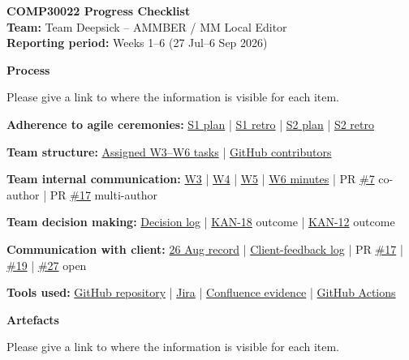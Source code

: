 \documentclass[10pt,a4paper]{article}
\newcommand{\ghbase}{https://github.com/lkevincc0/mm-local-editor}
\newcommand{\PR}[1]{\href{\ghbase/pull/#1}{\##1}}
\newcommand{\jirabase}{https://student-team-zvzgb5e3.atlassian.net}
\newcommand{\JIRA}[1]{\href{\jirabase/browse/KAN-#1}{KAN-#1}}
\newcommand{\wikibase}{https://student-team-zvzgb5e3.atlassian.net/wiki/spaces/~7120206e0163ea5d37428b992775145124d7e8/pages/}
\newcommand{\wpage}[2]{\href{\wikibase#1}{#2}}
\begin{document}
\begin{center}
{\LARGE\bfseries\color{accent} COMP30022 Progress Checklist}\\[3pt]
{\normalsize \textbf{Team:} Team Deepsick -- AMMBER / MM Local Editor}\\[1pt]
{\normalsize \textbf{Reporting period:} Weeks 1--6 (27 Jul--6 Sep 2026)}
\end{center}

{\large\bfseries\color{accent} Process}\par\vspace{-2pt}
{\small\color{muted} Please give a link to where the information is visible for each item.}\par

\textbf{\color{accent}Adherence to agile ceremonies:} \wpage{524291}{S1 plan} | \wpage{557355}{S1 retro} | \wpage{458808}{S2 plan} | \wpage{458855}{S2 retro}

\textbf{\color{accent}Team structure:} \href{\jirabase/issues/?jql=key\%20in\%20\%28KAN-24\%2CKAN-25\%2CKAN-26\%2CKAN-27\%2CKAN-28\%2CKAN-29\%2CKAN-30\%2CKAN-31\%2CKAN-32\%2CKAN-33\%2CKAN-34\%2CKAN-35\%2CKAN-36\%2CKAN-37\%29\%20ORDER\%20BY\%20key\%20ASC}{Assigned W3--W6 tasks} | \href{\ghbase/graphs/contributors}{GitHub contributors}

\textbf{\color{accent}Team internal communication:} \wpage{458771}{W3} | \wpage{557224}{W4} | \wpage{557269}{W5} | \wpage{557316}{W6 minutes} | PR \PR{7} co-author | PR \PR{17} multi-author

\textbf{\color{accent}Team decision making:} \wpage{557378}{Decision log} | \JIRA{18} outcome | \JIRA{12} outcome

\textbf{\color{accent}Communication with client:} \wpage{557269}{26 Aug record} | \wpage{524330}{Client-feedback log} | PR \PR{17} | \PR{19} | \PR{27} open

\textbf{\color{accent}Tools used:} \href{\ghbase}{GitHub repository} | \href{\jirabase/jira/software/projects/KAN/boards/1}{Jira} | \wpage{458754}{Confluence evidence} | \href{\ghbase/actions}{GitHub Actions}

{\large\bfseries\color{accent} Artefacts}\par\vspace{-2pt}
{\small\color{muted} Please give a link to where the information is visible for each item.}\par
\end{document}
